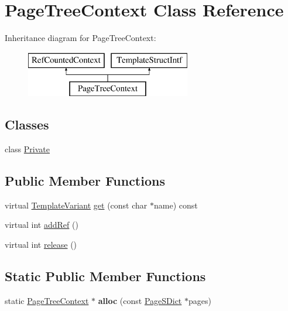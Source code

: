 \hypertarget{class_page_tree_context}{}\section{Page\+Tree\+Context Class Reference}
\label{class_page_tree_context}
Inheritance diagram for Page\+Tree\+Context\+:\begin{figure}[H]
\begin{center}
\leavevmode
\includegraphics[height=2.000000cm]{class_page_tree_context}
\end{center}
\end{figure}
\subsection*{Classes}
\begin{DoxyCompactItemize}
\item 
class \mbox{\hyperlink{class_page_tree_context_1_1_private}{Private}}
\end{DoxyCompactItemize}
\subsection*{Public Member Functions}
\begin{DoxyCompactItemize}
\item 
virtual \mbox{\hyperlink{class_template_variant}{Template\+Variant}} \mbox{\hyperlink{class_page_tree_context_ae4f5bf1ae906fd0b23b1ca48b79bf288}{get}} (const char $\ast$name) const
\item 
virtual int \mbox{\hyperlink{class_page_tree_context_ab0c3eb857f63c20d9bbc8b65223d052c}{add\+Ref}} ()
\item 
virtual int \mbox{\hyperlink{class_page_tree_context_ae55145312b83e56e57c3e59311d788c2}{release}} ()
\end{DoxyCompactItemize}
\subsection*{Static Public Member Functions}
\begin{DoxyCompactItemize}
\item 
\mbox{\label{class_page_tree_context_a365310eee9df15d739e382c16fdd4ae1}} 
static \mbox{\hyperlink{class_page_tree_context}{Page\+Tree\+Context}} $\ast$ {\bfseries alloc} (const \mbox{\hyperlink{class_page_s_dict}{Page\+S\+Dict}} $\ast$pages)
\end{DoxyCompactItemize}


